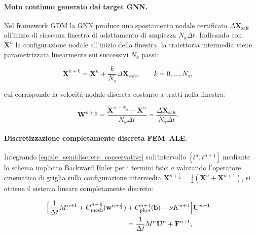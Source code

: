 \paragraph{Moto continuo generato dai target GNN.}

Nel framework GDM la GNN produce uno spostamento nodale certificato $\Delta\mathbf{X}_{\mathrm{safe}}$ all'inizio di ciascuna finestra di adattamento di ampiezza $N_a\Delta t$. Indicando con $\mathbf{X}^{n}$ la configurazione nodale all'inizio della finestra, la traiettoria intermedia viene parametrizzata linearmente sui successivi $N_a$ passi:

\begin{equation}
\mathbf{X}^{n+k}
=
\mathbf{X}^{n}
+
\frac{k}{N_a}
\Delta\mathbf{X}_{\mathrm{safe}},
\qquad
k=0,\ldots,N_a,
\label{eq:continuous_mesh_motion}
\end{equation}

cui corrisponde la velocità nodale discreta costante a tratti nella finestra:

\begin{equation}
\mathbf{W}^{n+\frac12}
=
\frac{
\mathbf{X}^{n+N_a}
-
\mathbf{X}^{n}
}{
N_a\Delta t
}
=
\frac{
\Delta\mathbf{X}_{\mathrm{safe}}
}{
N_a\Delta t
}.
\label{eq:discrete_mesh_velocity}
\end{equation}

\paragraph{Discretizzazione completamente discreta FEM--ALE.}

Integrando \eqref{eq:ale_semidiscrete_conservative} sull'intervallo $[t^n,t^{n+1}]$ mediante lo schema implicito Backward Euler per i termini fisici e valutando l'operatore cinematico di griglia sulla configurazione intermedia $\mathbf{X}^{n+\frac12} = \allowbreak \frac{1}{2}(\mathbf{X}^n + \mathbf{X}^{n+1})$, si ottiene il sistema lineare completamente discreto:

\begin{equation}
\begin{aligned}
\Bigl[
\frac{1}{\Delta t}M^{n+1}
+
C_{\mathrm{mesh}}^{n+\frac12}(\mathbf{w}^{n+\frac12})
&+
C_{\mathrm{phys}}^{n+1}(\mathbf{b})
+
\nu K^{n+1}
\Bigr]
\mathbf{U}^{n+1}
\\
&=
\frac{1}{\Delta t}M^{n}\mathbf{U}^{n}
+
\mathbf{F}^{n+1},
\end{aligned}
\label{eq:ale_fully_discrete}
\end{equation}

